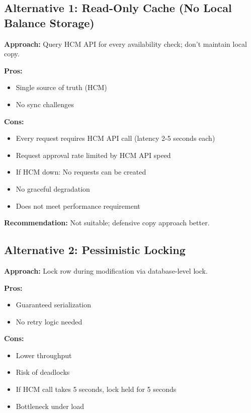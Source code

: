 \documentclass[12pt,a4paper]{article}
\begin{document}
\subsection{Alternative 1: Read-Only Cache (No Local Balance Storage)}

\textbf{Approach:} Query HCM API for every availability check; don't maintain local copy.

\textbf{Pros:}
\begin{itemize}
    \item Single source of truth (HCM)
    \item No sync challenges
\end{itemize}

\textbf{Cons:}
\begin{itemize}
    \item Every request requires HCM API call (latency 2-5 seconds each)
    \item Request approval rate limited by HCM API speed
    \item If HCM down: No requests can be created
    \item No graceful degradation
    \item Does not meet performance requirement
\end{itemize}

\textbf{Recommendation:} Not suitable; defensive copy approach better.

\subsection{Alternative 2: Pessimistic Locking}

\textbf{Approach:} Lock row during modification via database-level lock.

\textbf{Pros:}
\begin{itemize}
    \item Guaranteed serialization
    \item No retry logic needed
\end{itemize}

\textbf{Cons:}
\begin{itemize}
    \item Lower throughput
    \item Risk of deadlocks
    \item If HCM call takes 5 seconds, lock held for 5 seconds
    \item Bottleneck under load
\end{itemize}
\end{document}
